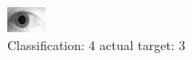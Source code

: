 \begin{figure}[h!]
\begin{center}
\includegraphics[width=0.60\columnwidth]{figures/ID1866_class_4_target_3.png}
\end{center}
\caption{ Classification: 4 actual target: 3}
\label{fig:ID1866_class_4_target_3}
\end{figure}
